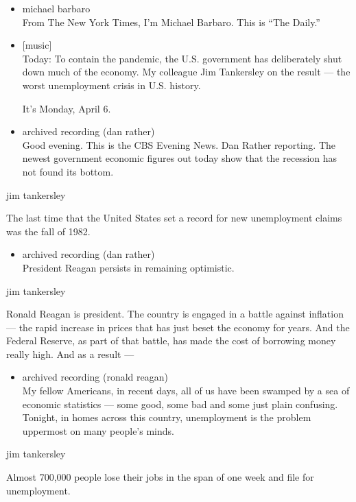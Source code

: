 \begin{itemize}
\item
  michael barbaro\\
  From The New York Times, I'm Michael Barbaro. This is ``The Daily.''
\item
  {[}music{]}\\
  Today: To contain the pandemic, the U.S. government has deliberately
  shut down much of the economy. My colleague Jim Tankersley on the
  result --- the worst unemployment crisis in U.S. history.

  It's Monday, April 6.
\item
  archived recording (dan rather)\\
  Good evening. This is the CBS Evening News. Dan Rather reporting. The
  newest government economic figures out today show that the recession
  has not found its bottom.
\end{itemize}

jim tankersley

The last time that the United States set a record for new unemployment
claims was the fall of 1982.

\begin{itemize}
\tightlist
\item
  archived recording (dan rather)\\
  President Reagan persists in remaining optimistic.
\end{itemize}

jim tankersley

Ronald Reagan is president. The country is engaged in a battle against
inflation --- the rapid increase in prices that has just beset the
economy for years. And the Federal Reserve, as part of that battle, has
made the cost of borrowing money really high. And as a result ---

\begin{itemize}
\tightlist
\item
  archived recording (ronald reagan)\\
  My fellow Americans, in recent days, all of us have been swamped by a
  sea of economic statistics --- some good, some bad and some just plain
  confusing. Tonight, in homes across this country, unemployment is the
  problem uppermost on many people's minds.
\end{itemize}

jim tankersley

Almost 700,000 people lose their jobs in the span of one week and file
for unemployment.

